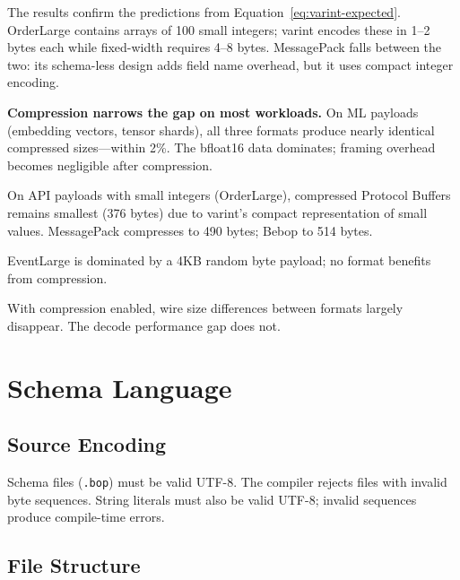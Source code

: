 \documentclass[11pt,onecolumn]{article}
\begin{document}
The results confirm the predictions from Equation~\ref{eq:varint-expected}. OrderLarge contains arrays of 100 small integers; varint encodes these in 1--2 bytes each while fixed-width requires 4--8 bytes. MessagePack falls between the two: its schema-less design adds field name overhead, but it uses compact integer encoding.

\textbf{Compression narrows the gap on most workloads.} On ML payloads (embedding vectors, tensor shards), all three formats produce nearly identical compressed sizes---within 2\%. The bfloat16 data dominates; framing overhead becomes negligible after compression.

On API payloads with small integers (OrderLarge), compressed Protocol Buffers remains smallest (376 bytes) due to varint's compact representation of small values. MessagePack compresses to 490 bytes; Bebop to 514 bytes.

EventLarge is dominated by a 4KB random byte payload; no format benefits from compression.

With compression enabled, wire size differences between formats largely disappear. The decode performance gap does not.


\newpage
\section{Schema Language}

\subsection{Source Encoding}

Schema files (\texttt{.bop}) must be valid UTF-8. The compiler rejects files with invalid byte sequences. String literals must also be valid UTF-8; invalid sequences produce compile-time errors.

\subsection{File Structure}
\end{document}
